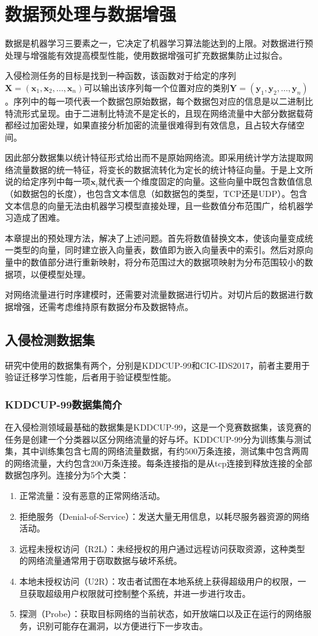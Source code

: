 \chapter{数据预处理与数据增强}
数据是机器学习三要素之一，它决定了机器学习算法能达到的上限。对数据进行预处理与增强能有效提高模型性能，使用数据增强可扩充数据集防止过拟合。

入侵检测任务的目标是找到一种函数，该函数对于给定的序列$ \mathbf{X} = (\mathbf{x}_1, \mathbf{x}_2, \ldots, \mathbf{x}_n) $可以输出该序列每一个位置对应的类别$ \mathbf{Y} = (\mathbf{y}_1, \mathbf{y}_2, \ldots, \mathbf{y}_n) $。序列中的每一项代表一个数据包原始数据，每个数据包对应的信息是以二进制比特流形式呈现。由于二进制比特流不是定长的，且现在网络流量中大部分数据载荷都经过加密处理，如果直接分析加密的流量很难得到有效信息，且占较大存储空间。

因此部分数据集以统计特征形式给出而不是原始网络流。即采用统计学方法提取网络流量数据的统一特征，将变长的数据流转化为定长的统计特征向量。于是上文所说的给定序列中每一项$\mathbf{x}_i$就代表一个维度固定的向量。这些向量中既包含数值信息（如数据包的长度），也包含文本信息（如数据包的类型，TCP还是UDP）。包含文本信息的向量无法由机器学习模型直接处理，且一些数值分布范围广，给机器学习造成了困难。

本章提出的预处理方法，解决了上述问题。首先将数值替换文本，使该向量变成统一类型的向量，同时建立嵌入向量表，数值即为嵌入向量表中的索引。然后对原向量中的数值部分进行重新映射，将分布范围过大的数据项映射为分布范围较小的数据项，以便模型处理。

对网络流量进行时序建模时，还需要对流量数据进行切片。对切片后的数据进行数据增强，还需考虑维持原有数据分布及数据特点。
\section{入侵检测数据集}
研究中使用的数据集有两个，分别是KDDCUP-99和CIC-IDS2017\cite{Sharafaldin2018TowardGA}，前者主要用于验证迁移学习性能，后者用于验证模型性能。
\subsection{KDDCUP-99数据集简介}

在入侵检测领域最基础的数据集是KDDCUP-99，这是一个竞赛数据集，该竞赛的任务是创建一个分类器以区分网络流量的好与坏。KDDCUP-99分为训练集与测试集，其中训练集包含七周的网络流量数据，有约500万条连接，测试集中包含两周的网络流量，大约包含200万条连接。每条连接指的是从tcp连接到释放连接的全部数据包序列。连接分为5个大类：
\begin{enumerate}
\item 正常流量：没有恶意的正常网络活动。
\item 拒绝服务（Denial-of-Service）：发送大量无用信息，以耗尽服务器资源的网络活动。
\item 远程未授权访问（R2L）：未经授权的用户通过远程访问获取资源，这种类型的网络流量通常用于窃取数据与破坏系统。
\item 本地未授权访问（U2R）：攻击者试图在本地系统上获得超级用户的权限，一旦获取超级用户权限就可控制整个系统，并进一步进行攻击。
\item 探测（Probe）：获取目标网络的当前状态，如开放端口以及正在运行的网络服务，识别可能存在漏洞，以方便进行下一步攻击。
\end{enumerate}

